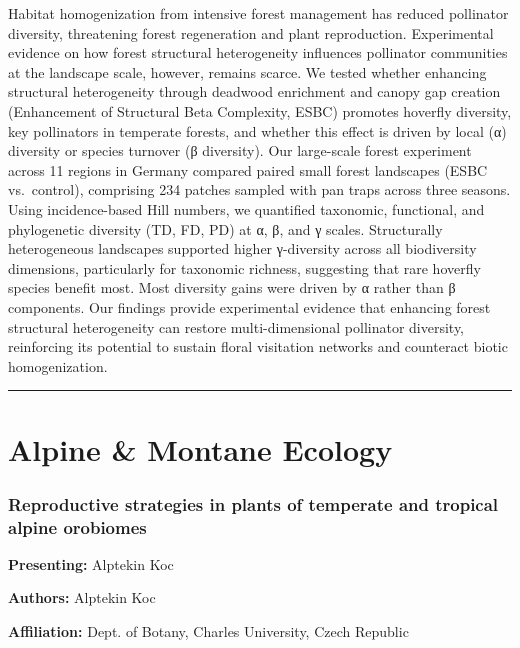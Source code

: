 \documentclass[
  letterpaper,
  DIV=11,
  numbers=noendperiod]{scrartcl}
\begin{document}
Habitat homogenization from intensive forest management has reduced
pollinator diversity, threatening forest regeneration and plant
reproduction. Experimental evidence on how forest structural
heterogeneity influences pollinator communities at the landscape scale,
however, remains scarce. We tested whether enhancing structural
heterogeneity through deadwood enrichment and canopy gap creation
(Enhancement of Structural Beta Complexity, ESBC) promotes hoverfly
diversity, key pollinators in temperate forests, and whether this effect
is driven by local (α) diversity or species turnover (β diversity). Our
large-scale forest experiment across 11 regions in Germany compared
paired small forest landscapes (ESBC vs.~control), comprising 234
patches sampled with pan traps across three seasons. Using
incidence-based Hill numbers, we quantified taxonomic, functional, and
phylogenetic diversity (TD, FD, PD) at α, β, and γ scales. Structurally
heterogeneous landscapes supported higher γ-diversity across all
biodiversity dimensions, particularly for taxonomic richness, suggesting
that rare hoverfly species benefit most. Most diversity gains were
driven by α rather than β components. Our findings provide experimental
evidence that enhancing forest structural heterogeneity can restore
multi-dimensional pollinator diversity, reinforcing its potential to
sustain floral visitation networks and counteract biotic homogenization.

\begin{center}\rule{0.5\linewidth}{0.5pt}\end{center}

\section{Alpine \& Montane Ecology}\label{alpine-montane-ecology}

\subsubsection{Reproductive strategies in plants of temperate and
tropical alpine
orobiomes}\label{reproductive-strategies-in-plants-of-temperate-and-tropical-alpine-orobiomes}

\textbf{Presenting:} Alptekin Koc

\textbf{Authors:} Alptekin Koc

\textbf{Affiliation:} Dept. of Botany, Charles University, Czech
Republic
\end{document}
